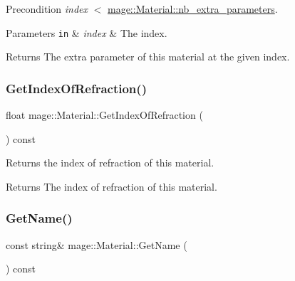 \begin{DoxyPrecond}{Precondition}
{\itshape index} {\ttfamily $<$} \hyperlink{structmage_1_1_material_a91e2bfd0c66c244bbae0faddbee1119f}{mage\+::\+Material\+::nb\+\_\+extra\+\_\+parameters}. 
\end{DoxyPrecond}

\begin{DoxyParams}[1]{Parameters}
\mbox{\tt in}  & {\em index} & The index. \\
\hline
\end{DoxyParams}
\begin{DoxyReturn}{Returns}
The extra parameter of this material at the given index. 
\end{DoxyReturn}
\hypertarget{structmage_1_1_material_afa719020dabd412bbb06ac9f0d85abe9}{}\label{structmage_1_1_material_afa719020dabd412bbb06ac9f0d85abe9} 
\subsubsection{\texorpdfstring{Get\+Index\+Of\+Refraction()}{GetIndexOfRefraction()}}
{\footnotesize\ttfamily float mage\+::\+Material\+::\+Get\+Index\+Of\+Refraction (\begin{DoxyParamCaption}{ }\end{DoxyParamCaption}) const\hspace{0.3cm}{\ttfamily [noexcept]}}

Returns the index of refraction of this material.

\begin{DoxyReturn}{Returns}
The index of refraction of this material. 
\end{DoxyReturn}
\hypertarget{structmage_1_1_material_a9edb2f437eca07c6c12c24d10ec30eb3}{}\label{structmage_1_1_material_a9edb2f437eca07c6c12c24d10ec30eb3} 
\subsubsection{\texorpdfstring{Get\+Name()}{GetName()}}
{\footnotesize\ttfamily const string\& mage\+::\+Material\+::\+Get\+Name (\begin{DoxyParamCaption}{ }\end{DoxyParamCaption}) const\hspace{0.3cm}{\ttfamily [noexcept]}}

